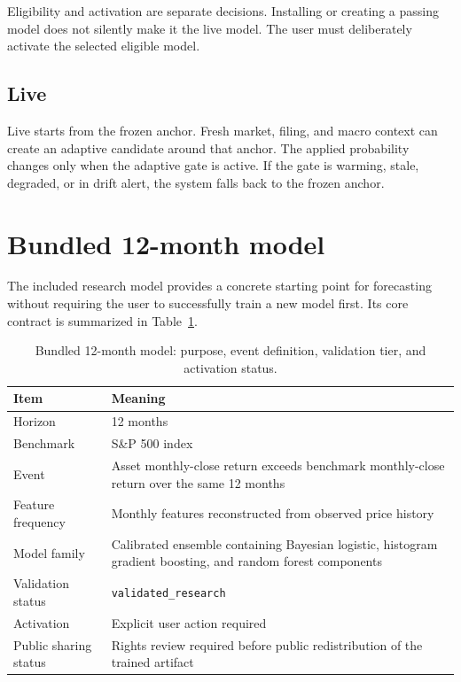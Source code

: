 \documentclass[11pt]{article}
\begin{document}
Eligibility and activation are separate decisions. Installing or creating a passing model does not silently make it the live model. The user must deliberately activate the selected eligible model.

\subsection{Live}

Live starts from the frozen anchor. Fresh market, filing, and macro context can create an adaptive candidate around that anchor. The applied probability changes only when the adaptive gate is active. If the gate is warming, stale, degraded, or in drift alert, the system falls back to the frozen anchor.

\section{Bundled 12-month model}

The included research model provides a concrete starting point for forecasting without requiring the user to successfully train a new model first. Its core contract is summarized in Table~\ref{tab:bundledplain}.

\begin{table}[tbp]
\centering
\small
\caption{Bundled 12-month model: purpose, event definition, validation tier, and activation status.}
\label{tab:bundledplain}
\begin{tabularx}{\textwidth}{@{}p{}X@{}}
\toprule
Item & Meaning \\
\midrule
Horizon & 12 months \\
Benchmark & S\&P 500 index \\
Event & Asset monthly-close return exceeds benchmark monthly-close return over the same 12 months \\
Feature frequency & Monthly features reconstructed from observed price history \\
Model family & Calibrated ensemble containing Bayesian logistic, histogram gradient boosting, and random forest components \\
Validation status & \texttt{validated\_research} \\
Activation & Explicit user action required \\
Public sharing status & Rights review required before public redistribution of the trained artifact \\
\bottomrule
\end{tabularx}
\end{table}
\end{document}
